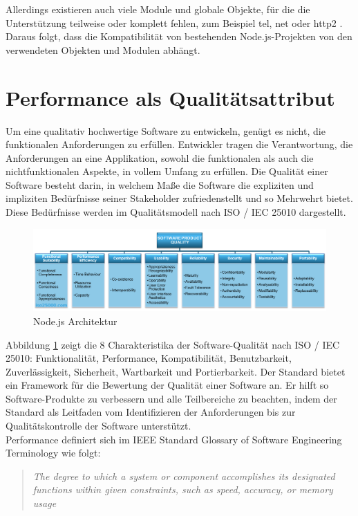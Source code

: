 \noindent
Allerdings existieren auch viele Module und globale Objekte, für die die Unterstützung teilweise oder komplett fehlen, zum Beispiel \glqq tel\grqq{}, \glqq net\grqq{} oder \glqq http2\grqq{} \cite{Bun.}. Daraus folgt, dass die Kompatibilität von bestehenden Node.js-Projekten von den verwendeten Objekten und Modulen abhängt.

\section{Performance als Qualitätsattribut} \label{sec:foundations-Performance}
Um eine qualitativ hochwertige Software zu entwickeln, genügt es nicht, die funktionalen Anforderungen zu erfüllen. Entwickler tragen die Verantwortung, die Anforderungen an eine Applikation, sowohl die funktionalen als auch die nichtfunktionalen Aspekte, in vollem Umfang zu erfüllen. Die Qualität einer Software besteht darin, in welchem Maße die Software die expliziten und impliziten Bedürfnisse seiner Stakeholder zufriedenstellt und so Mehrwehrt bietet. Diese Bedürfnisse werden im Qualitätsmodell nach ISO / IEC 25010 dargestellt.\cite{.2022}\\

\begin{figure}[h]
	\centering
	\includegraphics[width=\linewidth]{./images/iso25010.png}
	\caption[Node.js Architektur]{Node.js Architektur \cite{.2022}}
	\label{fig:softwareQuality}
\end{figure}

\noindent
Abbildung \ref{fig:softwareQuality} zeigt die 8 Charakteristika der Software-Qualität nach ISO / IEC 25010: Funktionalität, Performance, Kompatibilität, Benutzbarkeit, Zuverlässigkeit, Sicherheit, Wartbarkeit und Portierbarkeit. Der Standard bietet ein Framework für die Bewertung der Qualität einer Software an. Er hilft so Software-Produkte zu verbessern und alle Teilbereiche zu beachten, indem der Standard als Leitfaden vom Identifizieren der Anforderungen bis zur Qualitätskontrolle der Software unterstützt.\cite{ISOIEC.}\\

\noindent
Performance definiert sich im IEEE Standard Glossary of Software Engineering Terminology wie folgt:
\begin{quote}
	\emph{\glqq The degree to which a system or component accomplishes its designated functions within given constraints, such as speed, accuracy, or memory usage\grqq{}} \cite{IEEE.}
\end{quote}

